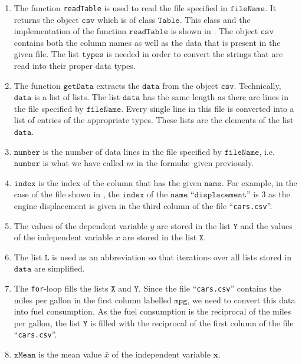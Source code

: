 \begin{enumerate}
\item The function \texttt{readTable} is used to read the file specified in $\mathtt{fileName}$.
      It returns the object $\mathtt{csv}$ which is of class $\mathtt{Table}$.  This class and the implementation of the function
      $\mathtt{readTable}$ is shown in .  The object $\mathtt{csv}$ contains both the column
      names as well as the data that is present in the given file.  The list $\mathtt{types}$ is needed in
      order to convert the strings that are read into their proper data types.
\item The function $\mathtt{getData}$ extracts the $\mathtt{data}$ from the object $\mathtt{csv}$.
      Technically, $\mathtt{data}$ is a list of lists.  The list $\mathtt{data}$ has the same length as there are lines
      in the file specified by $\mathtt{fileName}$.  Every single line in this file is converted
      into a list of entries of the appropriate types.  These lists are the elements of the list $\mathtt{data}$.
\item $\mathtt{number}$ is the number of data lines in the file specified by $\mathtt{fileName}$,
      i.e.~$\mathtt{number}$ is what we have called $m$ in the formul\ae\ given previously.
\item $\mathtt{index}$ is the index of the column that has the given $\mathtt{name}$.
      For example, in the case of the file shown in , the $\mathtt{index}$ of the
      $\mathtt{name}$ ``$\mathtt{displacement}$'' is $3$ as the engine displacement is given in the third
      column of the file ``\texttt{cars.csv}''.
\item The values of the dependent variable $y$ are stored in the list $\mathtt{Y}$ and the values of the
      independent variable $x$ are stored in the list $\mathtt{X}$.
\item The list $\mathtt{L}$ is used as an abbreviation so that iterations over all lists stored in
      $\mathtt{data}$ are simplified.
\item The \texttt{for}-loop fills the lists $\mathtt{X}$ and $\mathtt{Y}$.  Since the file
      ``\texttt{cars.csv}'' contains the miles per gallon in the first column labelled $\mathtt{mpg}$,
      we need to convert this data into fuel consumption.  As the fuel consumption is the reciprocal of the miles per
      gallon, the list $\mathtt{Y}$ is filled with the reciprocal of the first column of the file
      ``\texttt{cars.csv}''. 
\item $\mathtt{xMean}$ is the mean value $\bar{x}$ of the independent variable $\mathbf{x}$.

\end{enumerate}
